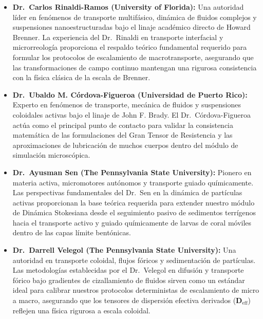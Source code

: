 \begin{itemize}
    \item \textbf{Dr.~Carlos Rinaldi-Ramos (University of Florida):} Una autoridad líder en fenómenos de transporte multifásico, dinámica de fluidos complejos y suspensiones nanoestructuradas bajo el linaje académico directo de Howard Brenner. La experiencia del Dr.~Rinaldi en transporte interfacial y microrreología proporciona el respaldo teórico fundamental requerido para formular los protocolos de escalamiento de macrotransporte, asegurando que las transformaciones de campo continuo mantengan una rigurosa consistencia con la física clásica de la escala de Brenner.
    \item \textbf{Dr.~Ubaldo M. C\'{o}rdova-Figueroa (Universidad de Puerto Rico):} Experto en fenómenos de transporte, mecánica de fluidos y suspensiones coloidales activas bajo el linaje de John F. Brady. El Dr.~C\'{o}rdova-Figueroa actúa como el principal punto de contacto para validar la consistencia matemática de las formulaciones del Gran Tensor de Resistencia y las aproximaciones de lubricación de muchos cuerpos dentro del módulo de simulación microscópica.
    \item \textbf{Dr.~Ayusman Sen (The Pennsylvania State University):} Pionero en materia activa, micromotores autónomos y transporte guiado químicamente. Las perspectivas fundamentales del Dr.~Sen en la dinámica de partículas activas proporcionan la base teórica requerida para extender nuestro módulo de Dinámica Stokesiana desde el seguimiento pasivo de sedimentos terrígenos hacia el transporte activo y guiado químicamente de larvas de coral móviles dentro de las capas límite bentónicas.
    \item \textbf{Dr.~Darrell Velegol (The Pennsylvania State University):} Una autoridad en transporte coloidal, flujos fóricos y sedimentación de partículas. Las metodologías establecidas por el Dr.~Velegol en difusión y transporte fórico bajo gradientes de cizallamiento de fluidos sirven como un estándar ideal para calibrar nuestros protocolos deterministas de escalamiento de micro a macro, asegurando que los tensores de dispersión efectiva derivados ($\bm{D}_{\text{eff}}$) reflejen una física rigurosa a escala coloidal.
\end{itemize}

